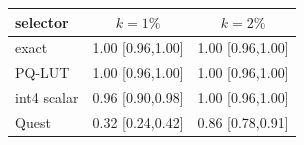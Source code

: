 \begin{tabular}{l c c}
\toprule
selector & $k{=}1\%$ & $k{=}2\%$ \\
\midrule
exact & 1.00 [0.96,1.00] & 1.00 [0.96,1.00] \\
PQ-LUT & 1.00 [0.96,1.00] & 1.00 [0.96,1.00] \\
int4 scalar & 0.96 [0.90,0.98] & 1.00 [0.96,1.00] \\
Quest & 0.32 [0.24,0.42] & 0.86 [0.78,0.91] \\
\bottomrule
\end{tabular}
